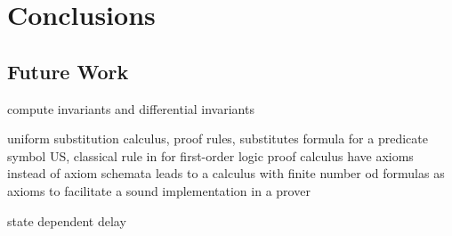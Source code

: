 \chapter{Conclusions}
    \section{Future Work}
    	compute invariants and differential invariants

    	uniform substitution calculus, proof rules, substitutes formula for a predicate symbol
    	US, classical rule in for first-order logic proof calculus
    	have axioms instead of axiom schemata
    	leads to a calculus with finite number od \ddL formulas as axioms
    	to facilitate a sound implementation in a prover

    	state dependent delay
